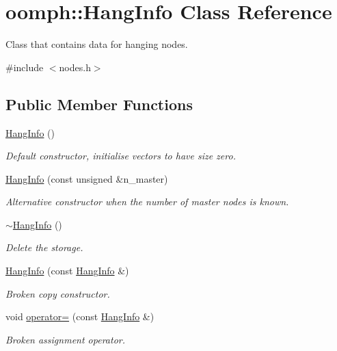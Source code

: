 \hypertarget{classoomph_1_1HangInfo}{}\section{oomph\+:\+:Hang\+Info Class Reference}
\label{classoomph_1_1HangInfo}


Class that contains data for hanging nodes.  




{\ttfamily \#include $<$nodes.\+h$>$}

\subsection*{Public Member Functions}
\begin{DoxyCompactItemize}
\item 
\hyperlink{classoomph_1_1HangInfo_a23d3ff929ac052ecb401e2a929e8ca64}{Hang\+Info} ()
\begin{DoxyCompactList}\small\item\em Default constructor, initialise vectors to have size zero. \end{DoxyCompactList}\item 
\hyperlink{classoomph_1_1HangInfo_a72416a50e81cf0646aed5501c8949bf1}{Hang\+Info} (const unsigned \&n\+\_\+master)
\begin{DoxyCompactList}\small\item\em Alternative constructor when the number of master nodes is known. \end{DoxyCompactList}\item 
\hyperlink{classoomph_1_1HangInfo_a12e76983eb02020a62cd49db543414a2}{$\sim$\+Hang\+Info} ()
\begin{DoxyCompactList}\small\item\em Delete the storage. \end{DoxyCompactList}\item 
\hyperlink{classoomph_1_1HangInfo_a4b5af6e4adb35de2c039be5b9e26d662}{Hang\+Info} (const \hyperlink{classoomph_1_1HangInfo}{Hang\+Info} \&)
\begin{DoxyCompactList}\small\item\em Broken copy constructor. \end{DoxyCompactList}\item 
void \hyperlink{classoomph_1_1HangInfo_a0b9609ab03f3a1a47a58029e81102466}{operator=} (const \hyperlink{classoomph_1_1HangInfo}{Hang\+Info} \&)
\begin{DoxyCompactList}\small\item\em Broken assignment operator. \end{DoxyCompactList}\item 

\end{DoxyCompactItemize}
